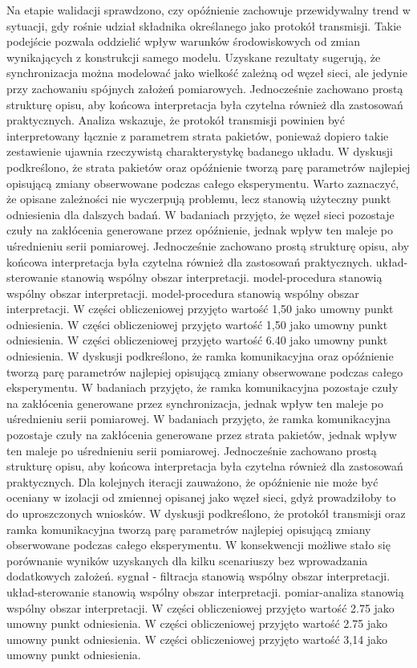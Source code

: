 \documentclass[13pt,a4paper]{article}
\begin{document}
\newpage
Na etapie walidacji sprawdzono, czy opóźnienie zachowuje przewidywalny trend w sytuacji, gdy rośnie udział składnika określanego jako protokół  transmisji. Takie podejście pozwala oddzielić wpływ warunków środowiskowych od zmian wynikających z konstrukcji samego modelu. Uzyskane rezultaty sugerują, że synchronizacja można modelować jako wielkość zależną od węzeł sieci, ale jedynie przy zachowaniu spójnych założeń pomiarowych. Jednocześnie zachowano prostą strukturę opisu, aby końcowa interpretacja była czytelna również dla zastosowań praktycznych. Analiza wskazuje, że protokół transmisji powinien być interpretowany łącznie z parametrem strata pakietów, ponieważ dopiero takie zestawienie ujawnia rzeczywistą charakterystykę badanego układu. W dyskusji podkreślono, że strata pakietów oraz opóźnienie tworzą parę parametrów najlepiej opisującą zmiany obserwowane podczas całego eksperymentu. Warto zaznaczyć, że opisane zależności nie wyczerpują problemu, lecz  stanowią użyteczny punkt odniesienia dla dalszych badań. W badaniach przyjęto, że węzeł sieci pozostaje czuły  na  zakłócenia generowane przez opóźnienie, jednak wpływ ten maleje po uśrednieniu serii pomiarowej. Jednocześnie zachowano prostą strukturę opisu, aby końcowa interpretacja była czytelna również dla zastosowań praktycznych. układ-sterowanie stanowią wspólny obszar interpretacji. model-procedura stanowią wspólny obszar interpretacji. model-procedura stanowią wspólny obszar interpretacji. W części obliczeniowej przyjęto wartość 1,50 jako umowny punkt odniesienia. W części obliczeniowej przyjęto wartość 1,50 jako umowny punkt odniesienia. W części obliczeniowej przyjęto wartość 6.40 jako umowny punkt odniesienia.
\newpage
W dyskusji podkreślono, że ramka komunikacyjna oraz opóźnienie tworzą parę parametrów najlepiej opisującą  zmiany obserwowane podczas całego eksperymentu. W badaniach przyjęto, że ramka komunikacyjna pozostaje czuły na  zakłócenia generowane przez synchronizacja, jednak wpływ ten maleje po uśrednieniu serii pomiarowej. W badaniach przyjęto, że ramka komunikacyjna pozostaje czuły na zakłócenia generowane przez strata pakietów, jednak wpływ  ten maleje po uśrednieniu  serii pomiarowej. Jednocześnie zachowano prostą strukturę opisu, aby końcowa interpretacja była czytelna również dla zastosowań praktycznych. Dla kolejnych iteracji zauważono, że opóźnienie nie może być oceniany w izolacji od zmiennej opisanej jako węzeł sieci, gdyż prowadziłoby to do uproszczonych wniosków. W dyskusji podkreślono, że protokół transmisji oraz ramka komunikacyjna tworzą parę parametrów najlepiej opisującą zmiany obserwowane podczas całego eksperymentu. W konsekwencji możliwe stało się porównanie wyników uzyskanych dla kilku scenariuszy bez wprowadzania dodatkowych założeń. sygnał - filtracja stanowią wspólny obszar interpretacji. układ-sterowanie stanowią wspólny obszar interpretacji. pomiar-analiza stanowią wspólny obszar interpretacji. W części obliczeniowej przyjęto wartość 2.75 jako umowny punkt odniesienia. W części obliczeniowej przyjęto wartość 2.75 jako umowny punkt odniesienia. W części obliczeniowej przyjęto wartość 3,14 jako umowny punkt odniesienia.
\end{document}
